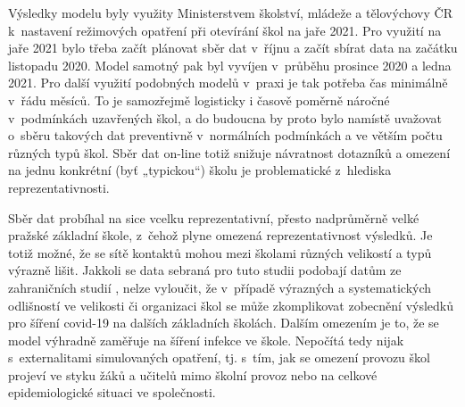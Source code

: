 Výsledky modelu byly využity Ministerstvem školství, mládeže a tělovýchovy ČR k~nastavení režimových opatření při otevírání škol na jaře 2021. Pro využití na jaře 2021 bylo třeba začít plánovat sběr dat v~říjnu a začít sbírat data na začátku listopadu 2020. Model samotný pak byl vyvíjen v~průběhu prosince 2020 a ledna 2021. Pro další využití podobných modelů v~praxi je tak potřeba čas minimálně v~řádu měsíců. To je samozřejmě logisticky i časově poměrně náročné v~podmínkách uzavřených škol, a do budoucna by proto bylo namístě uvažovat o~sběru takových dat preventivně v~normálních podmínkách a ve větším počtu různých typů škol. Sběr dat on-line totiž snižuje návratnost dotazníků a omezení na jednu konkrétní (byť „typickou“) školu je problematické z~hlediska reprezentativnosti.

Sběr dat probíhal na sice vcelku reprezentativní, přesto nadprůměrně velké pražské základní škole, z~čehož plyne omezená reprezentativnost výsledků. Je totiž možné, že se sítě kontaktů mohou mezi školami různých velikostí a typů výrazně lišit. Jakkoli se data sebraná pro tuto studii podobají datům ze zahraničních studií \cite{gemmetto2014mitigation, mcgee2021model, stehle2011high}, nelze vyloučit, že v~případě výrazných a systematických odlišností ve velikosti či organizaci škol se může zkomplikovat zobecnění výsledků pro šíření covid-19 na dalších základních školách. Dalším omezením je to, že se model výhradně zaměřuje na šíření infekce ve škole. Nepočítá tedy nijak s~externalitami simulovaných opatření, tj. s~tím, jak se omezení provozu škol projeví ve styku žáků a učitelů mimo školní provoz nebo na celkové epidemiologické situaci ve společnosti.









